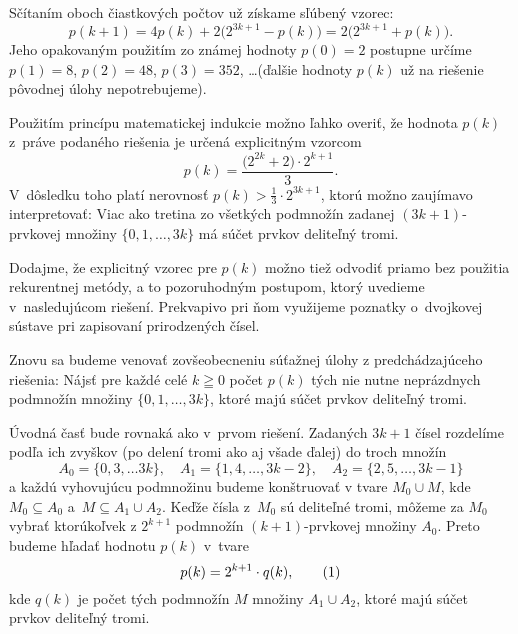 {\smallskip\noindent
Sčítaním oboch čiastkových počtov už získame sľúbený vzorec:
$$
p(k+1)=4p(k)+2\bigl(2^{3k+1}-p(k)\bigr)=
2\bigl(2^{3k+1}+p(k)\bigr).
$$
Jeho opakovaným použitím zo známej hodnoty $p(0)=2$ postupne určíme
$p(1)=8$, $p(2)=48$, $p(3)=352$, \dots (ďalšie hodnoty $p(k)$
už na riešenie pôvodnej úlohy nepotrebujeme).

\poznamka
Použitím princípu matematickej indukcie možno ľahko overiť, že hodnota
$p(k)$ z~práve podaného riešenia je určená explicitným vzorcom
$$
p(k)=\frac{\bigl(2^{2k}+2\bigr)\cdot2^{k+1}}{3}.
$$
V~dôsledku toho platí nerovnosť $p(k)>\frac13\cdot2^{3k+1}$,
ktorú možno zaujímavo interpretovať:
Viac ako tretina zo všetkých podmnožín zadanej $(3k+1)$-prvkovej množiny
$\{0,1,\ldots,3k\}$ má súčet prvkov deliteľný tromi.

Dodajme, že explicitný vzorec pre $p(k)$ možno tiež
odvodiť priamo bez použitia rekurentnej metódy, a to pozoruhodným
postupom, ktorý uvedieme v~nasledujúcom riešení. Prekvapivo pri
ňom využijeme poznatky o~dvojkovej sústave pri zapisovaní
prirodzených čísel.

\ineriesenie
Znovu sa budeme venovať zovšeobecneniu súťažnej úlohy z predchádzajúceho
riešenia: Nájsť pre každé celé $k\geqq0$ počet $p(k)$
tých nie nutne neprázdnych podmnožín množiny $\{0,1,\ldots,3k\}$,
ktoré majú súčet prvkov deliteľný tromi.

Úvodná časť bude rovnaká ako v~prvom riešení.
Zadaných $3k+1$ čísel rozdelíme podľa ich zvyškov (po delení tromi
ako aj všade ďalej) do troch množín
$$
A_0=\{0,3,\dots 3k\},\quad A_1=\{1,4,\dots,3k-2\},\quad
A_2=\{2,5,\dots,3k-1\}
$$
a každú vyhovujúcu podmnožinu budeme konštruovať v tvare
$M_0\cup M$, kde $M_0\subseteq A_0$ a~$M\subseteq A_1\cup A_2$.
Keďže čísla z~$M_0$ sú deliteľné tromi, môžeme za $M_0$ vybrať
ktorúkoľvek z $2^{k+1}$ podmnožín $(k+1)$-prvkovej množiny $A_0$. Preto
budeme hľadať hodnotu $p(k)$ v~tvare
$$
p(k)=2^{k+1}\cdot q(k),
\tag1
$$
kde $q(k)$ je počet tých podmnožín $M$ množiny $A_1\cup A_2$,
ktoré majú súčet prvkov deliteľný tromi.

}
